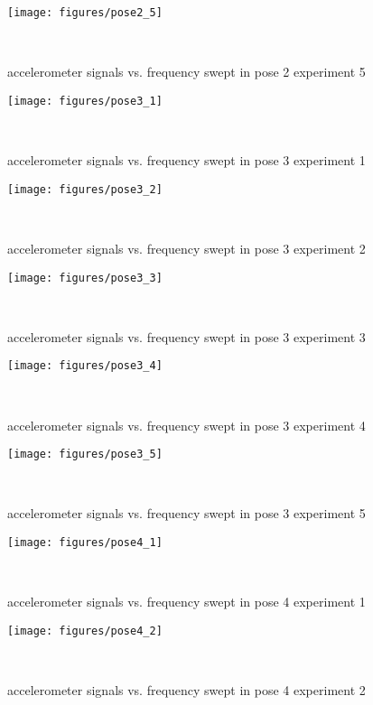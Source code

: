 \documentclass{sigchi}
\begin{document}
\begin{figure*}
  \centering
  \texttt{[image: figures/pose2\_5]}
  \caption{accelerometer signals vs. frequency swept in pose 2 experiment 5}
    ~\label{fig:pose2_5}
\end{figure*}

\begin{figure*}
  \centering
  \texttt{[image: figures/pose3\_1]}
  \caption{accelerometer signals vs. frequency swept in pose 3 experiment 1}
    ~\label{fig:pose3_1}
\end{figure*}

\begin{figure*}
  \centering
  \texttt{[image: figures/pose3\_2]}
  \caption{accelerometer signals vs. frequency swept in pose 3 experiment 2}
    ~\label{fig:pose3_2}
\end{figure*}

\begin{figure*}
  \centering
  \texttt{[image: figures/pose3\_3]}
  \caption{accelerometer signals vs. frequency swept in pose 3 experiment 3}
    ~\label{fig:pose3_3}
\end{figure*}

\begin{figure*}
  \centering
  \texttt{[image: figures/pose3\_4]}
  \caption{accelerometer signals vs. frequency swept in pose 3 experiment 4}
    ~\label{fig:pose3_4}
\end{figure*}

\begin{figure*}
  \centering
  \texttt{[image: figures/pose3\_5]}
  \caption{accelerometer signals vs. frequency swept in pose 3 experiment 5}
    ~\label{fig:pose3_5}
\end{figure*}

\begin{figure*}
  \centering
  \texttt{[image: figures/pose4\_1]}
  \caption{accelerometer signals vs. frequency swept in pose 4 experiment 1}
    ~\label{fig:pose4_1}
\end{figure*}

\begin{figure*}
  \centering
  \texttt{[image: figures/pose4\_2]}
  \caption{accelerometer signals vs. frequency swept in pose 4 experiment 2}
    ~\label{fig:pose4_2}
\end{figure*}
\end{document}
